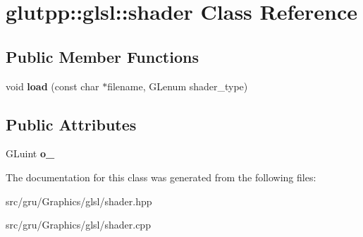 \hypertarget{classglutpp_1_1glsl_1_1shader}{\section{glutpp\-:\-:glsl\-:\-:shader \-Class \-Reference}
\label{classglutpp_1_1glsl_1_1shader}
}
\subsection*{\-Public \-Member \-Functions}
\begin{DoxyCompactItemize}
\item 
\hypertarget{classglutpp_1_1glsl_1_1shader_a661319769ee74bc8ee182f00083c80ac}{void {\bfseries load} (const char $\ast$filename, \-G\-Lenum shader\-\_\-type)}\label{classglutpp_1_1glsl_1_1shader_a661319769ee74bc8ee182f00083c80ac}

\end{DoxyCompactItemize}
\subsection*{\-Public \-Attributes}
\begin{DoxyCompactItemize}
\item 
\hypertarget{classglutpp_1_1glsl_1_1shader_ad8049417565860b1b5d51171c6ace8dd}{\-G\-Luint {\bfseries o\-\_\-}}\label{classglutpp_1_1glsl_1_1shader_ad8049417565860b1b5d51171c6ace8dd}

\end{DoxyCompactItemize}


\-The documentation for this class was generated from the following files\-:\begin{DoxyCompactItemize}
\item 
src/gru/\-Graphics/glsl/shader.\-hpp\item 
src/gru/\-Graphics/glsl/shader.\-cpp\end{DoxyCompactItemize}

